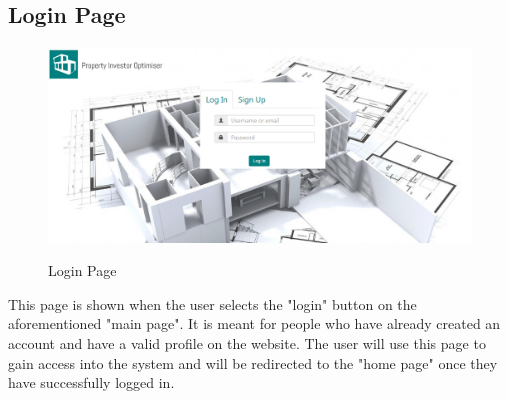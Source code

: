 \documentclass[a4paper,12pt]{article}
\begin{document}
\subsection{Login Page}
	\begin{figure}[H]
		\includegraphics[width=0.9\linewidth, center]{./System/Login.PNG}\\[0.4cm]  
		\caption{Login Page}
	\end{figure}
This page is shown when the user selects the "login" button on the aforementioned "main page". It is meant for people who have already created an account and have a valid profile on the website. The user will use this page to gain access into the system and will be redirected to the "home page" once they have successfully logged in.
\end{document}
